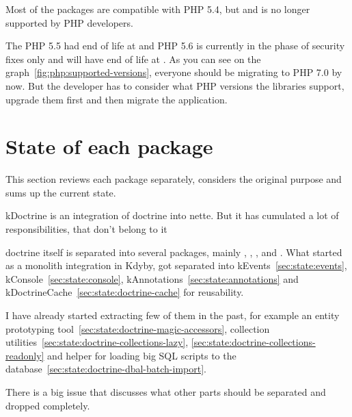 Most of the packages are compatible with PHP 5.4, but  and is no longer supported by PHP developers.

The PHP 5.5 had end of life at  and PHP 5.6 is currently in the phase of security fixes only and will have end of life at . As you can see on the graph~\ref{fig:php:supported-versions}, everyone should be migrating to PHP 7.0 by now. But the developer has to consider what PHP versions the libraries support, upgrade them first and then migrate the application.

\section{State of each package}

This section reviews each package separately, considers the original purpose and sums up the current state.

 \label{sec:state:doctrine}

\gls{kDoctrine} is an integration of \gls{doctrine} into \gls{nette}. But it has cumulated a lot of responsibilities, that don't belong to it

\gls{doctrine} itself is separated into several packages, mainly , , ,  and . What started as a monolith integration in Kdyby, got separated into \gls{kEvents}~\ref{sec:state:events}, \gls{kConsole}~\ref{sec:state:console}, \gls{kAnnotations}~\ref{sec:state:annotations} and \gls{kDoctrineCache}~\ref{sec:state:doctrine-cache} for reusability.

I have already started extracting few of them in the past, for example an entity prototyping tool~\ref{sec:state:doctrine-magic-accessors}, collection utilities~\ref{sec:state:doctrine-collections-lazy}, \ref{sec:state:doctrine-collections-readonly} and helper for loading big SQL scripts to the database~\ref{sec:state:doctrine-dbal-batch-import}.

There is a big issue  that discusses what other parts should be separated and dropped completely.

